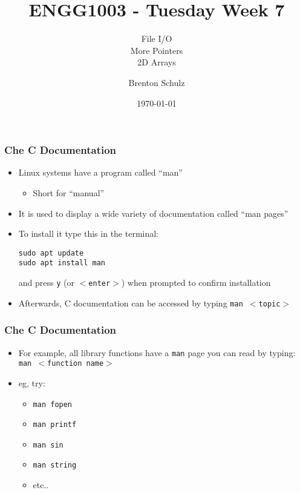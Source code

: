 \documentclass[14pt]{beamer}
\title{ENGG1003 - Tuesday Week 7}
\subtitle{File I/O\\More Pointers\\2D Arrays}
\author{Brenton Schulz}
\institute{University of Newcastle}
\date{\today}
\begin{document}
\titlepage

\begin{frame}[fragile]
\frametitle{Che C Documentation}
\begin{itemize}
\item Linux systems have a program called ``man''
	\begin{itemize}
		\item Short for ``manual''
	\end{itemize}
\item It is used to display a wide variety of documentation called ``man pages''
\item To install it type this in the terminal:
\begin{lstlisting}[style=pseudo]
sudo apt update 
sudo apt install man
\end{lstlisting}
and press \texttt{y} (or \texttt{$<$enter$>$}) when prompted to confirm installation
\item Afterwards, C documentation can be accessed by typing \texttt{man $<$topic$>$}
\end{itemize}
\end{frame}

\begin{frame}
\frametitle{Che C Documentation}
\begin{itemize}
\item For example, all library functions have a \texttt{man} page you can read by typing:\\\texttt{man $<$function name$>$}
\item eg, try:
	\begin{itemize}
		\item \texttt{man fopen}
		\item \texttt{man printf}
		\item \texttt{man sin}
		\item \texttt{man string}
		\item etc..
	\end{itemize}
\end{itemize}
\end{frame}
\end{document}
